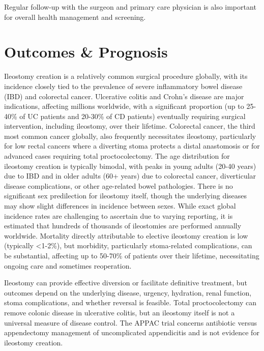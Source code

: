 Regular follow-up with the surgeon and primary care physician is also important for overall health management and screening.

\section*{Outcomes \& Prognosis}
Ileostomy creation is a relatively common surgical procedure globally, with its incidence closely tied to the prevalence of severe inflammatory bowel disease (IBD) and colorectal cancer. Ulcerative colitis and Crohn's disease are major indications, affecting millions worldwide, with a significant proportion (up to 25-40\% of UC patients and 20-30\% of CD patients) eventually requiring surgical intervention, including ileostomy, over their lifetime. Colorectal cancer, the third most common cancer globally, also frequently necessitates ileostomy, particularly for low rectal cancers where a diverting stoma protects a distal anastomosis or for advanced cases requiring total proctocolectomy. The age distribution for ileostomy creation is typically bimodal, with peaks in young adults (20-40 years) due to IBD and in older adults (60+ years) due to colorectal cancer, diverticular disease complications, or other age-related bowel pathologies. There is no significant sex predilection for ileostomy itself, though the underlying diseases may show slight differences in incidence between sexes. While exact global incidence rates are challenging to ascertain due to varying reporting, it is estimated that hundreds of thousands of ileostomies are performed annually worldwide. Mortality directly attributable to elective ileostomy creation is low (typically <1-2\%), but morbidity, particularly stoma-related complications, can be substantial, affecting up to 50-70\% of patients over their lifetime, necessitating ongoing care and sometimes reoperation.

Ileostomy can provide effective diversion or facilitate definitive treatment, but outcomes depend on the underlying disease, urgency, hydration, renal function, stoma complications, and whether reversal is feasible. Total proctocolectomy can remove colonic disease in ulcerative colitis, but an ileostomy itself is not a universal measure of disease control. The APPAC trial concerns antibiotic versus appendectomy management of uncomplicated appendicitis and is not evidence for ileostomy creation.

